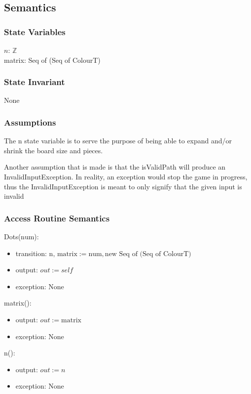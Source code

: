 \documentclass[12pt]{article}
\begin{document}
\subsection* {Semantics}

\subsubsection* {State Variables}

$n$: $\mathbb{Z}$\\
matrix: Seq of (Seq of ColourT)

\subsubsection* {State Invariant}

None

\subsubsection* {Assumptions}
The n state variable is to serve the purpose of being able to expand and/or shrink the board size and pieces. 

Another assumption that is made is that the isValidPath will produce an InvalidInputException.  In reality, an exception would stop the game in progress, thus the InvalidInputException is meant to only signify that the given input is invalid



\subsubsection* {Access Routine Semantics}

Dots($\mbox{num}$):
\begin{itemize}
\item transition: $\mbox{n, matrix} := \mbox{num}, \mbox{new Seq of (Seq of ColourT)} $
\item output: $out := \mathit{self}$
\item exception: None
\end{itemize}

\noindent matrix():
\begin{itemize}
\item output: $out := \mbox{matrix}$
\item exception: None
\end{itemize}

\noindent n():
\begin{itemize}
\item output: $out := n$
\item exception: None
\end{itemize}
\end{document}
